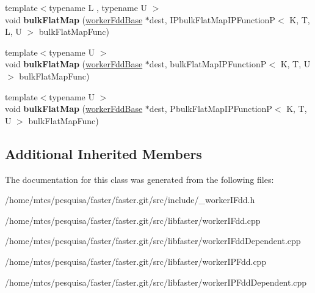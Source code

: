 \begin{DoxyCompactItemize}
{\footnotesize template$<$typename L , typename U $>$ }\\void {\bfseries bulk\+Flat\+Map} (\hyperlink{classfaster_1_1workerFddBase}{worker\+Fdd\+Base} $\ast$dest, I\+Pbulk\+Flat\+Map\+I\+P\+FunctionP$<$ K, T, L, U $>$ bulk\+Flat\+Map\+Func)
\item 
\hypertarget{classfaster_1_1__workerIFdd_ab69516c39651ef1caa7200027fa70a32}{}\label{classfaster_1_1__workerIFdd_ab69516c39651ef1caa7200027fa70a32} 
{\footnotesize template$<$typename U $>$ }\\void {\bfseries bulk\+Flat\+Map} (\hyperlink{classfaster_1_1workerFddBase}{worker\+Fdd\+Base} $\ast$dest, bulk\+Flat\+Map\+I\+P\+FunctionP$<$ K, T, U $>$ bulk\+Flat\+Map\+Func)
\item 
\hypertarget{classfaster_1_1__workerIFdd_a7daca5d9561429cf47fc31b8d1256e7f}{}\label{classfaster_1_1__workerIFdd_a7daca5d9561429cf47fc31b8d1256e7f} 
{\footnotesize template$<$typename U $>$ }\\void {\bfseries bulk\+Flat\+Map} (\hyperlink{classfaster_1_1workerFddBase}{worker\+Fdd\+Base} $\ast$dest, Pbulk\+Flat\+Map\+I\+P\+FunctionP$<$ K, T, U $>$ bulk\+Flat\+Map\+Func)
\end{DoxyCompactItemize}
\subsection*{Additional Inherited Members}


The documentation for this class was generated from the following files\+:\begin{DoxyCompactItemize}
\item 
/home/mtcs/pesquisa/faster/faster.\+git/src/include/\+\_\+worker\+I\+Fdd.\+h\item 
/home/mtcs/pesquisa/faster/faster.\+git/src/libfaster/worker\+I\+Fdd.\+cpp\item 
/home/mtcs/pesquisa/faster/faster.\+git/src/libfaster/worker\+I\+Fdd\+Dependent.\+cpp\item 
/home/mtcs/pesquisa/faster/faster.\+git/src/libfaster/worker\+I\+P\+Fdd.\+cpp\item 
/home/mtcs/pesquisa/faster/faster.\+git/src/libfaster/worker\+I\+P\+Fdd\+Dependent.\+cpp\end{DoxyCompactItemize}
